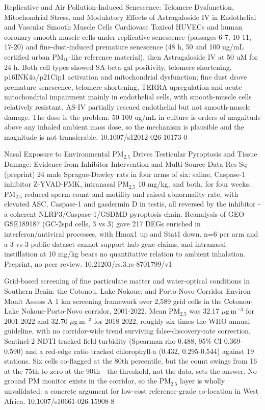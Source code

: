 \documentclass[10pt]{article}
\begin{document}
{Replicative and Air Pollution-Induced Senescence: Telomere Dysfunction, Mitochondrial Stress, and Modulatory Effects of Astragaloside IV in Endothelial and Vascular Smooth Muscle Cells}
{Cardiovasc Toxicol}
{HUVECs and human coronary smooth muscle cells under replicative senescence (passages 6-7, 10-11, 17-20) and fine-dust-induced premature senescence (48 h, 50 and 100 ug/mL certified urban PM$_{10}$-like reference material), then Astragaloside IV at 50 uM for 24 h. Both cell types showed SA-beta-gal positivity, telomere shortening, p16INK4a/p21Cip1 activation and mitochondrial dysfunction; fine dust drove premature senescence, telomere shortening, TERRA upregulation and acute mitochondrial impairment mainly in endothelial cells, with smooth-muscle cells relatively resistant. AS-IV partially rescued endothelial but not smooth-muscle damage. The dose is the problem: 50-100 ug/mL in culture is orders of magnitude above any inhaled ambient mass dose, so the mechanism is plausible and the magnitude is not transferable.}
{10.1007/s12012-026-10173-0}

{Nasal Exposure to Environmental PM$_{2.5}$ Drives Testicular Pyroptosis and Tissue Damage: Evidence from Inhibitor Intervention and Multi-Source Data}
{Res Sq (preprint)}
{24 male Sprague-Dawley rats in four arms of six: saline, Caspase-1 inhibitor Z-YVAD-FMK, intranasal PM$_{2.5}$ 10 mg/kg, and both, for four weeks. PM$_{2.5}$ reduced sperm count and motility and raised abnormality rate, with elevated ASC, Caspase-1 and gasdermin D in testis, all reversed by the inhibitor - a coherent NLRP3/Caspase-1/GSDMD pyroptosis chain. Reanalysis of GEO GSE189187 (GC-2spd cells, 3 vs 3) gave 217 DEGs enriched in interferon/antiviral processes, with Hmox1 up and Stat1 down. n=6 per arm and a 3-vs-3 public dataset cannot support hub-gene claims, and intranasal instillation at 10 mg/kg bears no quantitative relation to ambient inhalation. Preprint, no peer review.}
{10.21203/rs.3.rs-8701799/v1}


{Grid-based screening of fine particulate matter and water-optical conditions in Southern Benin: the Cotonou, Lake Nokoue, and Porto-Novo Corridor}
{Environ Monit Assess}
{A 1 km screening framework over 2,589 grid cells in the Cotonou-Lake Nokoue-Porto-Novo corridor, 2001-2022. Mean PM$_{2.5}$ was 32.17 $\mu$g\,m$^{-3}$ for 2001-2022 and 32.70 $\mu$g\,m$^{-3}$ for 2018-2022, roughly six times the WHO annual guideline, with no corridor-wide trend surviving false-discovery-rate correction. Sentinel-2 NDTI tracked field turbidity (Spearman rho 0.488, 95\% CI 0.369-0.590) and a red-edge ratio tracked chlorophyll-a (0.432, 0.295-0.544) against 19 stations. Six cells co-flagged at the 80th percentile, but the count swings from 16 at the 75th to zero at the 90th - the threshold, not the data, sets the answer. No ground PM monitor exists in the corridor, so the PM$_{2.5}$ layer is wholly unvalidated: a concrete argument for low-cost reference-grade co-location in West Africa.}
{10.1007/s10661-026-15908-8}
\end{document}
